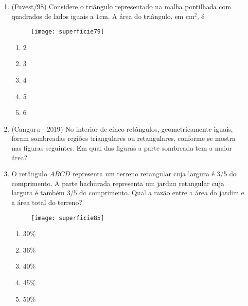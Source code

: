 \begin{enumerate}
  \item (Fuvest/98) Considere o triângulo representado na malha pontilhada com quadrados de lados iguais a $1$cm. A área do triângulo, em cm$^2$, é
  \begin{figure}[H]
  \centering

\texttt{[image: superficie79]}
  \end{figure}
  \begin{enumerate}
    \item 2
    \item 3
    \item 4
    \item 5
    \item 6
  \end{enumerate}

\clearpage
  \item (Canguru - 2019) No interior de cinco retângulos, geometricamente iguais, foram sombreadas regiões triangulares ou retangulares, conforme se mostra nas figuras seguintes. Em qual das figuras a parte sombreada tem a maior área?
  \begin{enumerate}
  \end{enumerate}
  

  \item O retângulo $ABCD$ representa um terreno retangular cuja largura é 3/5 do comprimento. A parte hachurada representa um jardim retangular cuja largura é também 3/5 do comprimento. Qual a razão entre a área do jardim e a área total do terreno?
  \begin{figure}[H]
  \centering

  \texttt{[image: superficie85]}
  \end{figure}
  \begin{enumerate}
    \item 30\%
    \item 36\%
    \item 40\%
    \item 45\%
    \item 50\%
  \end{enumerate}


\end{enumerate}
